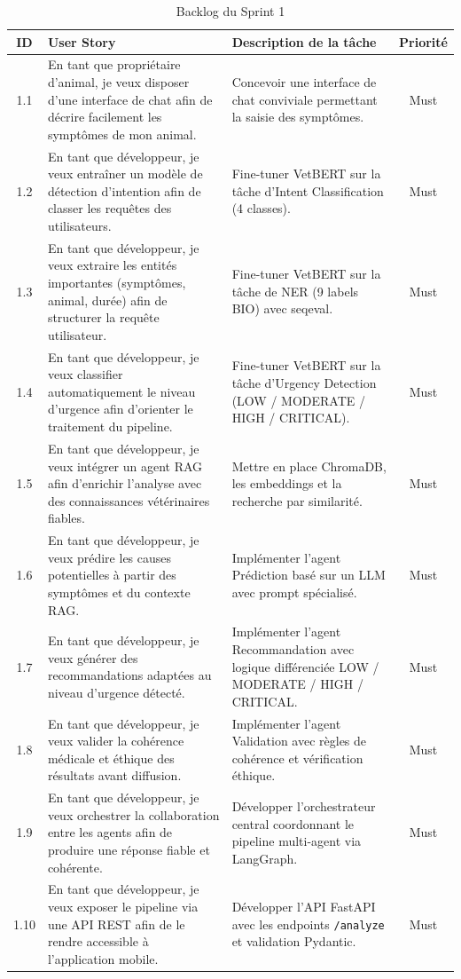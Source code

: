 \begin{table}[H]
\centering
\caption{Backlog du Sprint 1}
\label{tab:backlog-sprint1}
\renewcommand{\arraystretch}{1.4}
\begin{tabular}{|c|p{6.5cm}|p{6.5cm}|c|}
\hline
\textbf{ID} & \textbf{User Story} & \textbf{Description de la tâche} & \textbf{Priorité} \\
\hline
1.1 & En tant que propriétaire d'animal, je veux disposer d'une interface de chat afin de décrire facilement les symptômes de mon animal. & Concevoir une interface de chat conviviale permettant la saisie des symptômes. & Must \\
\hline
1.2 & En tant que développeur, je veux entraîner un modèle de détection d'intention afin de classer les requêtes des utilisateurs. & Fine-tuner VetBERT sur la tâche d'Intent Classification (4 classes). & Must \\
\hline
1.3 & En tant que développeur, je veux extraire les entités importantes (symptômes, animal, durée) afin de structurer la requête utilisateur. & Fine-tuner VetBERT sur la tâche de NER (9 labels BIO) avec seqeval. & Must \\
\hline
1.4 & En tant que développeur, je veux classifier automatiquement le niveau d'urgence afin d'orienter le traitement du pipeline. & Fine-tuner VetBERT sur la tâche d'Urgency Detection (LOW / MODERATE / HIGH / CRITICAL). & Must \\
\hline
1.5 & En tant que développeur, je veux intégrer un agent RAG afin d'enrichir l'analyse avec des connaissances vétérinaires fiables. & Mettre en place ChromaDB, les embeddings et la recherche par similarité. & Must \\
\hline
1.6 & En tant que développeur, je veux prédire les causes potentielles à partir des symptômes et du contexte RAG. & Implémenter l'agent Prédiction basé sur un LLM avec prompt spécialisé. & Must \\
\hline
1.7 & En tant que développeur, je veux générer des recommandations adaptées au niveau d'urgence détecté. & Implémenter l'agent Recommandation avec logique différenciée LOW / MODERATE / HIGH / CRITICAL. & Must \\
\hline
1.8 & En tant que développeur, je veux valider la cohérence médicale et éthique des résultats avant diffusion. & Implémenter l'agent Validation avec règles de cohérence et vérification éthique. & Must \\
\hline
1.9 & En tant que développeur, je veux orchestrer la collaboration entre les agents afin de produire une réponse fiable et cohérente. & Développer l'orchestrateur central coordonnant le pipeline multi-agent via LangGraph. & Must \\
\hline
1.10 & En tant que développeur, je veux exposer le pipeline via une API REST afin de le rendre accessible à l'application mobile. & Développer l'API FastAPI avec les endpoints \texttt{/analyze} et validation Pydantic. & Must \\
\hline
\end{tabular}
\end{table}

